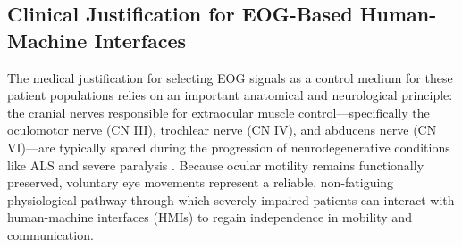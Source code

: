 \FloatBarrier
\subsection{Clinical Justification for EOG-Based Human-Machine Interfaces}
\label{subsec:clinical_justification}

The medical justification for selecting EOG signals as a control medium for these patient populations relies on an important anatomical and neurological principle: the cranial nerves responsible for extraocular muscle control—specifically the oculomotor nerve (CN III), trochlear nerve (CN IV), and abducens nerve (CN VI)—are typically spared during the progression of neurodegenerative conditions like ALS and severe paralysis \cite{hall2016guyton}. Because ocular motility remains functionally preserved, voluntary eye movements represent a reliable, non-fatiguing physiological pathway through which severely impaired patients can interact with human-machine interfaces (HMIs) to regain independence in mobility and communication.
